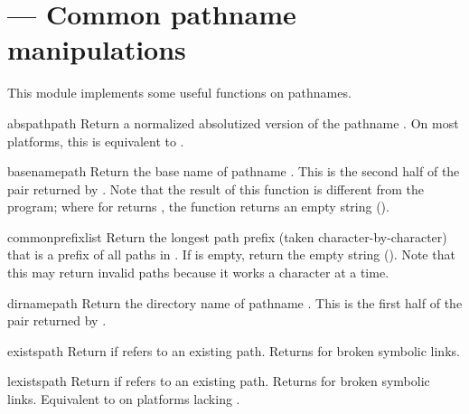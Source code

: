\section{ ---
         Common pathname manipulations}


This module implements some useful functions on pathnames.



\begin{funcdesc}{abspath}{path}
Return a normalized absolutized version of the pathname .
On most platforms, this is equivalent to
.
\end{funcdesc}

\begin{funcdesc}{basename}{path}
Return the base name of pathname .  This is the second half
of the pair returned by .  Note that the
result of this function is different from the
\UNIX{}  program; where  for
 returns , the 
function returns an empty string ().
\end{funcdesc}

\begin{funcdesc}{commonprefix}{list}
Return the longest path prefix (taken character-by-character) that is a
prefix of all paths in 
.  If  is empty, return the empty string
().  Note that this may return invalid paths because it works a
character at a time.
\end{funcdesc}

\begin{funcdesc}{dirname}{path}
Return the directory name of pathname .  This is the first
half of the pair returned by .
\end{funcdesc}

\begin{funcdesc}{exists}{path}
Return  if  refers to an existing path.
Returns  for broken symbolic links.
\end{funcdesc}

\begin{funcdesc}{lexists}{path}
Return  if  refers to an existing path.
Returns  for broken symbolic links.  
Equivalent to  on platforms lacking
.
\end{funcdesc}

